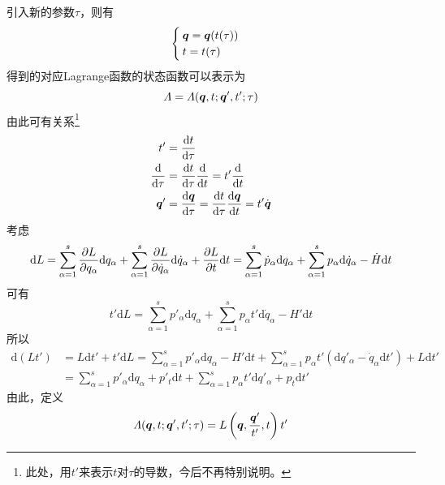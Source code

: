 引入新的参数$\tau$，则有
\begin{equation*}
	\begin{cases}
		\boldsymbol{q} = \boldsymbol{q}(t(\tau)) \\
		t = t(\tau)
	\end{cases}
\end{equation*}
得到的对应Lagrange函数的状态函数可以表示为
\begin{equation*}
	\mathnormal{\Lambda} = \mathnormal{\Lambda}(\boldsymbol{q},t;\boldsymbol{q}',t';\tau)
\end{equation*}
由此可有关系\footnote{此处，用$t'$来表示$t$对$\tau$的导数，今后不再特别说明。}
\begin{align*}
	t' &= \frac{\mathrm{d} t}{\mathrm{d} \tau} \\
	\frac{\mathrm{d}}{\mathrm{d} \tau} & = \frac{\mathrm{d} t}{\mathrm{d} \tau} \frac{\mathrm{d}}{\mathrm{d} t} = t' \frac{\mathrm{d}}{\mathrm{d} t} \\
	\boldsymbol{q}' &= \frac{\mathrm{d} \boldsymbol{q}}{\mathrm{d} \tau} = \frac{\mathrm{d} t}{\mathrm{d} \tau} \frac{\mathrm{d} \boldsymbol{q}}{\mathrm{d} t} = t' \dot{\boldsymbol{q}}
\end{align*}
考虑
\begin{equation*}
	\mathrm{d} L = \sum_{\alpha=1}^s \frac{\partial L}{\partial q_\alpha} \mathrm{d} q_\alpha + \sum_{\alpha=1}^s \frac{\partial L}{\partial \dot{q}_\alpha} \mathrm{d} \dot{q}_\alpha + \frac{\partial L}{\partial t} \mathrm{d} t = \sum_{\alpha=1}^s \dot{p}_\alpha \mathrm{d} q_\alpha + \sum_{\alpha=1}^s p_\alpha \mathrm{d} \dot{q}_\alpha - \dot{H} \mathrm{d} t
\end{equation*}
可有
\begin{equation*}
	t'\mathrm{d} L = \sum_{\alpha=1}^s p'_\alpha \mathrm{d} q_\alpha + \sum_{\alpha=1}^s p_\alpha t' \mathrm{d} \dot{q}_\alpha - H' \mathrm{d} t
\end{equation*}
所以
\begin{align}
	\mathrm{d} (Lt') & = L\mathrm{d} t' + t'\mathrm{d} L = \sum_{\alpha=1}^s p'_\alpha \mathrm{d} q_\alpha - H' \mathrm{d} t + \sum_{\alpha=1}^s p_\alpha t' (\mathrm{d} q'_\alpha - \dot{q}_\alpha \mathrm{d} t') + L\mathrm{d} t' \nonumber \\
	& = \sum_{\alpha=1}^s p'_\alpha \mathrm{d} q_\alpha + p'_t \mathrm{d} t + \sum_{\alpha=1}^s p_\alpha t' \mathrm{d} q'_\alpha + p_t\mathrm{d} t'
	\label{推广的Lagrange函数中间步骤}
\end{align}
由此，定义
\begin{equation*}
	\mathnormal{\Lambda}(\boldsymbol{q},t;\boldsymbol{q}',t';\tau) = L \left(\boldsymbol{q},\frac{\boldsymbol{q}'}{t'},t\right) t'
\end{equation*}
